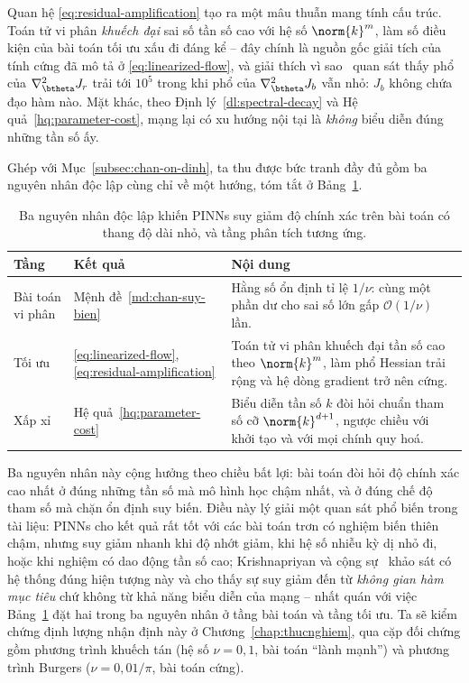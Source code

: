 Quan hệ \eqref{eq:residual-amplification} tạo ra một mâu thuẫn mang tính cấu
trúc. Toán tử vi phân \emph{khuếch đại} sai số tần số cao với hệ số
$\norm{k}^{m}$, làm số điều kiện của bài toán tối ưu xấu đi đáng kể -- đây chính
là nguồn gốc giải tích của tính cứng đã mô tả ở \eqref{eq:linearized-flow}, và
giải thích vì sao~\cite{wang2021} quan sát thấy phổ của
$\nabla^2_{\btheta}J_r$ trải tới $10^5$ trong khi phổ của
$\nabla^2_{\btheta}J_b$ vẫn nhỏ: $J_b$ không chứa đạo hàm nào. Mặt khác, theo
Định lý~\ref{dl:spectral-decay} và Hệ quả~\ref{hq:parameter-cost}, mạng lại có xu
hướng nội tại là \emph{không} biểu diễn đúng những tần số ấy.
 
Ghép với Mục~\ref{subsec:chan-on-dinh}, ta thu được bức tranh đầy đủ gồm ba
nguyên nhân độc lập cùng chỉ về một hướng, tóm tắt ở Bảng~\ref{tab:ba-nguyen-nhan}.
 
\begin{table}[htbp]
\centering
\caption{Ba nguyên nhân độc lập khiến PINNs suy giảm độ chính xác trên bài toán
có thang độ dài nhỏ, và tầng phân tích tương ứng.}
\label{tab:ba-nguyen-nhan}
\small
\begin{tabular}{@{}l l p{6.4cm}@{}}
\toprule
\textbf{Tầng} & \textbf{Kết quả} & \textbf{Nội dung} \\
\midrule
Bài toán vi phân & Mệnh đề~\ref{md:chan-suy-bien}
  & Hằng số ổn định tỉ lệ $1/\nu$: cùng một phần dư cho sai số lớn gấp
    $\mathcal{O}(1/\nu)$ lần. \\
\addlinespace
Tối ưu & \eqref{eq:linearized-flow}, \eqref{eq:residual-amplification}
  & Toán tử vi phân khuếch đại tần số cao theo $\norm{k}^m$, làm phổ Hessian
    trải rộng và hệ dòng gradient trở nên cứng. \\
\addlinespace
Xấp xỉ & Hệ quả~\ref{hq:parameter-cost}
  & Biểu diễn tần số $k$ đòi hỏi chuẩn tham số cỡ $\norm{k}^{d+1}$, ngược chiều
    với khởi tạo và với mọi chính quy hoá. \\
\bottomrule
\end{tabular}
\end{table}
 
Ba nguyên nhân này cộng hưởng theo chiều bất lợi: bài toán đòi hỏi độ chính xác
cao nhất ở đúng những tần số mà mô hình học chậm nhất, và ở đúng chế độ tham số
mà chặn ổn định suy biến. Điều này lý giải một quan sát phổ biến trong tài liệu:
PINNs cho kết quả rất tốt với các bài toán trơn có nghiệm biến thiên chậm, nhưng
suy giảm nhanh khi độ nhớt giảm, khi hệ số nhiễu kỳ dị nhỏ đi, hoặc khi nghiệm có
dao động tần số cao; Krishnapriyan và cộng sự~\cite{krishnapriyan2021} khảo sát
có hệ thống đúng hiện tượng này và cho thấy sự suy giảm đến từ \emph{không gian
hàm mục tiêu} chứ không từ khả năng biểu diễn của mạng -- nhất quán với việc
Bảng~\ref{tab:ba-nguyen-nhan} đặt hai trong ba nguyên nhân ở tầng bài toán và
tầng tối ưu. Ta sẽ kiểm chứng định lượng nhận định này ở
Chương~\ref{chap:thucnghiem}, qua cặp đối chứng gồm phương trình khuếch tán
(hệ số $\nu = 0{,}1$, bài toán ``lành mạnh'') và phương trình Burgers
($\nu = 0{,}01/\pi$, bài toán cứng).
 

